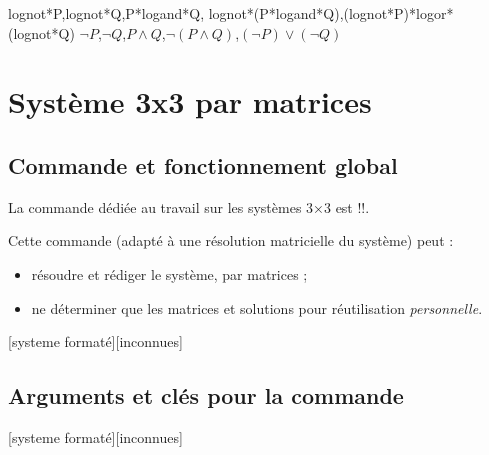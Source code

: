 \documentclass[french,a4paper,11pt]{article}
\begin{document}
{{\begin{DemoCode}[]
%
	{lognot*P,lognot*Q,P*logand*Q,
		lognot*(P*logand*Q),(lognot*P)*logor*(lognot*Q)}%
	{$\lnot P$,$\lnot Q$,$P\land Q$,$\lnot(P\land Q)$,$(\lnot P)\lor(\lnot Q)$}
\end{DemoCode}

\pagebreak

\section{Système 3x3 par matrices}

\subsection{Commande et fonctionnement global}

\begin{cautionblock}
La commande dédiée au travail sur les systèmes 3×3 est \motcletex!\ResolSystemeMatrices!.

Cette commande (adapté à une résolution matricielle du système) peut :

\begin{itemize}
	\item résoudre et rédiger le système, par matrices ;
	\item ne déterminer que les matrices et solutions pour réutilisation \textit{personnelle}.
\end{itemize}
\vspace*{-\baselineskip}\leavevmode
\end{cautionblock}

\begin{DemoCode}
[systeme formaté][inconnues]
\end{DemoCode}

\begin{DemoCode}[]
\end{DemoCode}

\subsection{Arguments et clés pour la commande}

\begin{DemoCode}
[systeme formaté][inconnues]
\end{DemoCode}

}}
\end{document}

